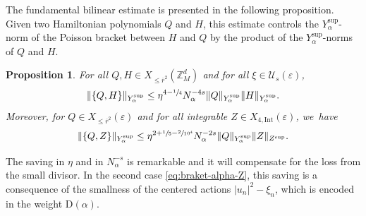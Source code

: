 \documentclass[JEP,XML,SOM,Unicode,published]{cedram}
\theoremstyle{plain}
\newtheorem{proposition}[theorem]{Proposition}
\theoremstyle{definition}
\newcommand{\Z}{\mathbb{Z}}
\newcommand{\1}{\mathbf{1}}
\newcommand{\Ysup}[1]{Y_{#1}^{\mathrm{sup}}}
\let\epsilon\varepsilon
\begin{document}
The fundamental bilinear estimate is presented in the following proposition. Given two Hamiltonian polynomials $Q$ and $H$, this estimate controls the $\Ysup{\alpha}$-norm of the Poisson bracket between $H$ and $Q$ by the product of the $\Ysup{\alpha}$-norms of $Q$ and $H$.
\begin{proposition}
\label{prop:bracket0} For all $Q,H \in X_{\leq\overline{r}^{2}}(\Z_{M}^{d})$ and for all $\xi\in\mathcal{U}_{s}(\epsilon)$,
\begin{equation}
\label{eq:braket-alpha}
\|\{Q,H\}\|_{\Ysup{\alpha}}
\leq \eta^{4-\sfrac{1}{4}}N_{\alpha}^{-4s}
\|Q\|_{\Ysup{\alpha}}
\|H\|_{\Ysup{\alpha}}.
\end{equation}
Moreover, for $Q\in X_{\leq\overline{r}^{2}}(\epsilon)$ and for all integrable $Z\in X_{4,\mathrm{Int}}(\epsilon)$, we~have
\begin{equation}
\label{eq:braket-alpha-Z}
\|\{Q,Z\}\|_{\Ysup{\alpha}} \leq \eta^{2+\sfrac{1}{5}-\sfrac{2}{10^{4}}}N_{\alpha}^{-2s}\|Q\|_{\Ysup{\alpha}}\|Z\|_{Z^{\mathrm{sup}}}.
\end{equation}
\end{proposition}
The saving in $\eta$ and in $N_{\alpha}^{-s}$ is remarkable and it will compensate for the loss from the small divisor. In the second case \eqref{eq:braket-alpha-Z}, this saving is a consequence of the smallness of the centered actions $|u_n|^{2}-\xi_{n}$, which is encoded in the weight $\mathrm{D}(\alpha)$.
\end{document}
